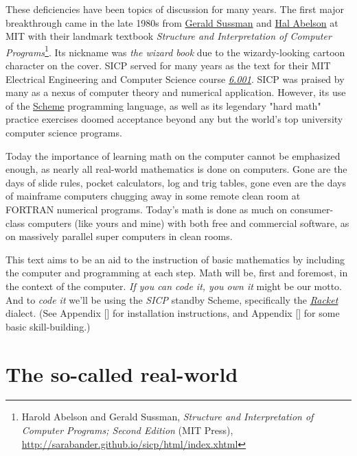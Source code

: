 \documentclass[koma]{article}
\begin{document}
These deficiencies have been topics of discussion for many years. The first major breakthrough came in the late 1980s from \href{https://en.wikipedia.org/wiki/Gerald_Jay_Sussman}{Gerald Sussman} and \href{https://en.wikipedia.org/wiki/Hal_Abelson}{Hal Abelson} at MIT with their landmark textbook \emph{Structure and Interpretation of Computer Programs}\footnote{Harold Abelson and Gerald Sussman, \emph{Structure and Interpretation of Computer Programs; Second Edition} (MIT Press), \url{http://sarabander.github.io/sicp/html/index.xhtml}}. Its nickname was \emph{the wizard book} due to the wizardy-looking cartoon character on the cover. SICP served for many years as the text for their MIT Electrical Engineering and Computer Science course \emph{\href{http://ocw.mit.edu/courses/electrical-engineering-and-computer-science/6-001-structure-and-interpretation-of-computer-programs-spring-2005/}{6.001}}. SICP was praised by many as a nexus of computer theory and numerical application. However, its use of the \href{https://en.wikipedia.org/wiki/Scheme_(programming_language)}{Scheme} programming language, as well as its legendary "hard math" practice exercises doomed acceptance beyond any but the world's top university computer science programs.

Today the importance of learning math on the computer cannot be emphasized enough, as nearly all real-world mathematics is done on computers. Gone are the days of slide rules, pocket calculators, log and trig tables, gone even are the days of mainframe computers chugging away in some remote clean room at FORTRAN numerical programs. Today's math is done as much on consumer-class computers (like yours and mine) with both free and commercial software, as on massively parallel super computers in clean rooms.

This text aims to be an aid to the instruction of basic mathematics by including the computer and programming at each step. Math will be, first and foremost, in the context of the computer. \emph{If you can code it, you own it} might be our motto. And to \emph{code it} we'll be using the \emph{SICP} standby Scheme, specifically the \emph{\href{https://racket-lang.org/}{Racket}} dialect. (See Appendix [] for installation instructions, and Appendix [] for some basic skill-building.)

\section{The so-called real-world}
\label{sec:orgheadline2}
\end{document}
